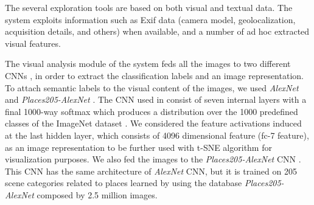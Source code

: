 The several exploration tools are based on both visual and textual data. The system exploits information such as Exif data (camera model, geolocalization, acquisition details, and others) when available, and a number of ad hoc extracted visual features.

The visual analysis module of the system feds all the images to two different CNNs \cite{krizhevsky2012imagenet, zhou2014learning}, in order to extract the classification labels and an image representation. To attach semantic labels to the visual content of the images, we used \textit{AlexNet} \cite{krizhevsky2012imagenet} and \textit{Places205-AlexNet} \cite{zhou2014learning}.
The CNN used in \cite{krizhevsky2012imagenet} consist of seven internal layers with a final 1000-way softmax which produces a distribution over the 1000 predefined classes of the ImageNet dataset \cite{ILSVRC15}. We considered the feature activations induced at the last hidden layer, which consists of 4096 dimensional feature (fc-7 feature), as an image representation to be further used with t-SNE algorithm \cite{van2008visualizing} for visualization purposes. 
We also fed the images to the \textit{Places205-AlexNet} CNN \cite{zhou2014learning}. This CNN has the same architecture of \textit{AlexNet} CNN, but it is trained on 205 scene categories related to places learned by using the database \textit{Places205-AlexNet} composed by 2.5 million images.

